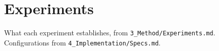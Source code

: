 \section{Experiments}
\label{sec:experiments}

What each experiment establishes, from \texttt{3\_Method/Experiments.md}. Configurations
from \texttt{4\_Implementation/Specs.md}.
